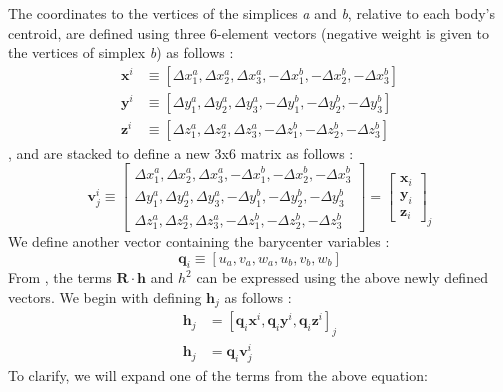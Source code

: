 The coordinates to the vertices of the simplices \textit{a} and \textit{b}, relative to each body's centroid, are defined using three 6-element vectors (negative weight is given to the vertices of simplex \textit{b}) as follows \cite{werner_poly}:
\begin{align}
\label{x_tensor}
\mathbf{x}^i &\equiv [\Delta x_1^a, \Delta x_2^a, \Delta x_3^a, -\Delta x_1^b, -\Delta x_2^b, -\Delta x_3^b]\\
\label{y_tensor}
\mathbf{y}^i &\equiv [\Delta y_1^a, \Delta y_2^a, \Delta y_3^a, -\Delta y_1^b, -\Delta y_2^b, -\Delta y_3^b]\\
\label{z_tensor}
\mathbf{z}^i &\equiv [\Delta z_1^a, \Delta z_2^a, \Delta z_3^a, -\Delta z_1^b, -\Delta z_2^b, -\Delta z_3^b]
\end{align}
%
,  and  are stacked to define a new 3x6 matrix as follows \cite{werner_poly}:
\begin{equation}
\label{v_tensor}
\mathbf{v}_j^i
\equiv
\begin{bmatrix}
\Delta x_1^a, \Delta x_2^a, \Delta x_3^a, -\Delta x_1^b, -\Delta x_2^b, -\Delta x_3^b\\
\Delta y_1^a, \Delta y_2^a, \Delta y_3^a, -\Delta y_1^b, -\Delta y_2^b, -\Delta y_3^b\\
\Delta z_1^a, \Delta z_2^a, \Delta z_3^a, -\Delta z_1^b, -\Delta z_2^b, -\Delta z_3^b
\end{bmatrix}
=
\begin{bmatrix}
\mathbf{x}_i\\
\mathbf{y}_i\\
\mathbf{z}_i
\end{bmatrix}_j
\end{equation}
%
We define another vector containing the barycenter variables \cite{werner_poly}:
\begin{equation}
\label{q_tensor}
\mathbf{q}_i \equiv [u_a, v_a, w_a, u_b, v_b, w_b]
\end{equation}
%
From , the terms $\mathbf{R} \cdot \mathbf{h}$ and $h^2$ can be expressed using the above newly defined vectors. We begin with defining $\mathbf{h}_j$ as follows \cite{werner_poly}:
\begin{align}
\mathbf{h}_j &= [\mathbf{q}_i \mathbf{x}^i, \mathbf{q}_i \mathbf{y}^i, \mathbf{q}_i \mathbf{z}^i]_j\\
\mathbf{h}_j &= \mathbf{q}_i \mathbf{v}_j^i
\end{align}
%
To clarify, we will expand one of the terms from the above equation:
